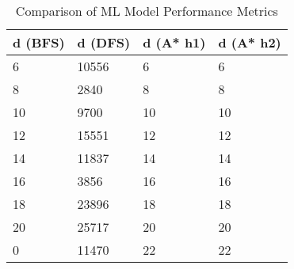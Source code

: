 \begin{table}[htbp]
\caption{Comparison of ML Model Performance Metrics}
\label{tab:model_comparison}
\begin{tabular}{|l|l|l|l|}
\toprule
d (BFS) & d (DFS) & d (A* h1) & d (A* h2) \\
\midrule
6 & 10556 & 6 & 6 \\
8 & 2840 & 8 & 8 \\
10 & 9700 & 10 & 10 \\
12 & 15551 & 12 & 12 \\
14 & 11837 & 14 & 14 \\
16 & 3856 & 16 & 16 \\
18 & 23896 & 18 & 18 \\
20 & 25717 & 20 & 20 \\
0 & 11470 & 22 & 22 \\
\bottomrule
\end{tabular}
\end{table}
